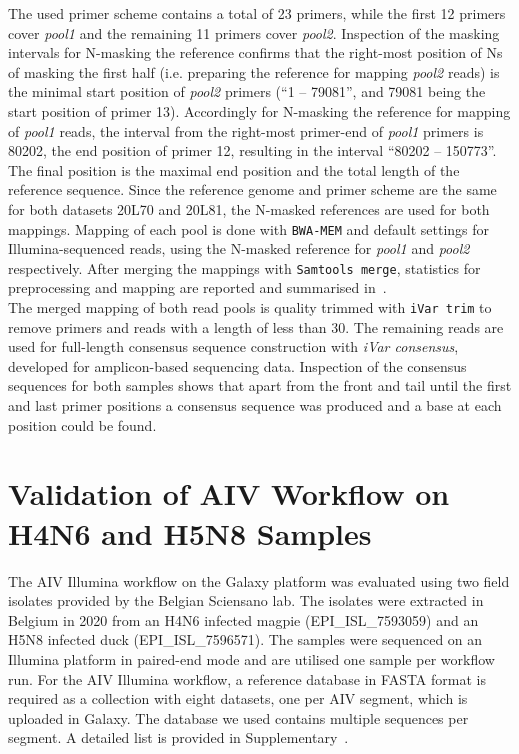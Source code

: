 The used primer scheme contains a total of 23 primers, while the first 12 primers cover \textit{pool1} and the remaining 11 primers cover \textit{pool2}. Inspection of the masking intervals for N-masking the reference confirms that the right-most position of Ns of masking the first half (i.e. preparing the reference for mapping \textit{pool2} reads) is the minimal start position of \textit{pool2} primers (``1 -- 79081'', and 79081 being the start position of primer 13). Accordingly for N-masking the reference for mapping of \textit{pool1} reads, the interval from the right-most primer-end of \textit{pool1} primers is 80202, the end position of primer 12, resulting in the interval ``80202 -- 150773''. The final position is the maximal end position and the total length of the reference sequence. Since the reference genome and primer scheme are the same for both datasets 20L70 and 20L81, the N-masked references are used for both mappings. Mapping of each pool is done with \texttt{BWA-MEM} and default settings for Illumina-sequenced reads, using the N-masked reference for \textit{pool1} and \textit{pool2} respectively. After merging the mappings with \texttt{Samtools merge}, statistics for preprocessing and mapping are reported and summarised in~. \\
The merged mapping of both read pools is quality trimmed with \texttt{iVar trim} to remove primers and reads with a length of less than 30. The remaining reads are used for full-length consensus sequence construction with \textit{iVar consensus}, developed for amplicon-based sequencing data. Inspection of the consensus sequences for both samples shows that apart from the front and tail until the first and last primer positions a consensus sequence was produced and a base at each position could be found.


\section{Validation of AIV Workflow on H4N6 and H5N8 Samples}\label{sec:4-aiv}
The \ac{AIV} Illumina workflow on the Galaxy platform was evaluated using two field isolates provided by the Belgian Sciensano lab. The isolates were extracted in Belgium in 2020 from an H4N6 infected magpie (EPI\_ISL\_7593059) and an H5N8 infected duck (EPI\_ISL\_7596571). The samples were sequenced on an Illumina platform in paired-end mode and are utilised one sample per workflow run. For the \ac{AIV} Illumina workflow, a reference database in FASTA format is required as a collection with eight datasets, one per \ac{AIV} segment, which is uploaded in Galaxy. The database we used contains multiple sequences per segment. A detailed list is provided in Supplementary~.\\

